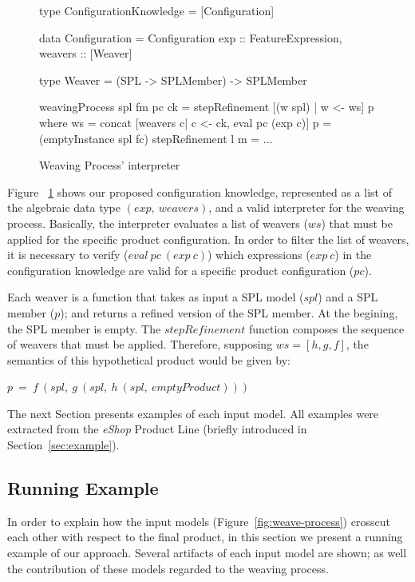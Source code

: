 \documentclass{acm_proc_article-sp}
\begin{document}
\begin{figure}[ht]
\begin{code}
type ConfigurationKnowledge = [Configuration]
 
data Configuration  = Configuration {
 exp :: FeatureExpression,
 weavers :: [Weaver] 	 
}

type Weaver = (SPL -> SPLMember) -> SPLMember

weavingProcess spl fm pc ck = 
   stepRefinement [(w spl) | w <- ws] p
   where 
    ws = concat [weavers c| c <- ck, eval pc (exp c)]
    p = (emptyInstance spl fc)
    stepRefinement l m = ...   	
\end{code}
\caption{Weaving Process' interpreter}
\label{fig:wp-semantics}
\end{figure}

Figure ~\ref{fig:wp-semantics} shows our proposed configuration knowledge,
represented as a list of the algebraic data type $(exp,\ weavers)$, and a valid
interpreter for the weaving process. Basically, 
the interpreter evaluates a list of weavers ($ws$) that must be applied for
the specific product configuration. In order to filter the list of weavers, it
is necessary to verify  ($eval\ pc\ (exp\ c)$) which expressions ($exp\ c$) in
the configuration knowledge are valid for a specific product configuration
($pc$).

Each weaver is a function that takes as input a SPL model
($spl$) and a SPL member ($p$); and returns a refined  
version of the SPL member. At the begining, the SPL member is empty. 
The $stepRefinement$ function composes the sequence of weavers that must
be applied. Therefore, supposing $ws = [h,g,f]$, the semantics of
this hypothetical product would be given by:

\begin{center}
$ p\ =\ f\ (spl,\ g\ (spl,\ h\ (spl,\ emptyProduct)))  $
\end{center}

The next Section presents examples of each input model. All examples were
extracted from the \emph{eShop} Product Line (briefly introduced in
Section~\ref{sec:example}). 


\subsection{Running Example}
\label{sub:running}

In order to explain how the input models (Figure~\ref{fig:weave-process})
crosscut each other with respect to the final product, in this section we
present a running example of our approach. Several artifacts of each input model
are shown; as well the contribution of these models regarded to the weaving
process.
\end{document}
